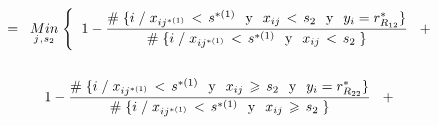 \documentclass[
  11pt,
  a4paper,
]{article}
\begin{document}
\begin{gather*}
=\hspace{0.2cm}   \underset{j \hspace{0.02cm},\hspace{0.02cm} s_2}  {Min} \hspace{0.1cm} \Biggl\{ \hspace{0.2cm}     1 - \dfrac{\# \hspace{0.1 cm}\lbrace i \hspace{0.1 cm}/\hspace{0.1 cm}  x_{ij^{*(1)}} \hspace{0.05cm}   < \hspace{0.05cm} s^{*(1)} \hspace{0.25 cm}\text{y}\hspace{0.25 cm} x_{ij} \hspace{0.05cm}   < \hspace{0.05cm} s_2 \hspace{0.25 cm}\text{y}\hspace{0.25 cm} y_i = r^*_{R_{12}} \rbrace}{\# \hspace{0.1 cm}\lbrace i \hspace{0.1 cm} / \hspace{0.1 cm}  x_{ij^{*(1)}} \hspace{0.05cm}   < \hspace{0.05cm} s^{*(1)} \hspace{0.25 cm}\text{y}\hspace{0.25 cm} x_{ij} \hspace{0.05cm}   < \hspace{0.05cm} s_2  \hspace{0.1 cm} \rbrace }      \hspace{0.3cm} + 
\\  \\
1 -  \dfrac{\# \hspace{0.1 cm}\lbrace i \hspace{0.1 cm}/\hspace{0.1 cm}  x_{ij^{*(1)}} \hspace{0.05cm}   < \hspace{0.05cm} s^{*(1)} \hspace{0.25 cm}\text{y}\hspace{0.25 cm} x_{ij} \hspace{0.05cm}   \geqslant \hspace{0.05cm} s_2 \hspace{0.25 cm}\text{y}\hspace{0.25 cm} y_i = r^*_{R_{22}} \rbrace}{\# \hspace{0.1 cm}\lbrace i \hspace{0.1 cm} / \hspace{0.1 cm}  x_{ij^{*(1)}} \hspace{0.05cm}   < \hspace{0.05cm} s^{*(1)} \hspace{0.25 cm}\text{y}\hspace{0.25 cm} x_{ij} \hspace{0.05cm}   \geqslant \hspace{0.05cm} s_2  \hspace{0.1 cm} \rbrace } \hspace{0.3cm} +  \\ \\

\end{gather*}
\end{document}
